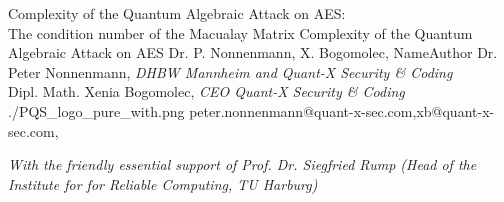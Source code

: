 \documentclass[a4paper,11pt]{article}
\begin{document}
\setcounter{footnote}{0}
\setcounter{figure}{0}



\Aufsatz 
{Complexity of the Quantum Algebraic Attack on AES:\\
The condition number of the Macualay Matrix}
{Complexity of the Quantum Algebraic Attack on AES}
{Dr. P. Nonnenmann, X. Bogomolec,}
{NameAuthor}
{Dr. Peter Nonnenmann,
{\small \textit{DHBW Mannheim and Quant-X Security {\&} Coding}} \\
Dipl. Math. Xenia Bogomolec, 
{\small \textit{CEO Quant-X Security {\&} Coding}} \\}
{./PQS_logo_pure_with.png}
{peter.nonnenmann@quant-x-sec.com,xb@quant-x-sec.com,} 

\noindent
{\small \textit{With the friendly essential support of Prof. Dr. Siegfried Rump (Head of the Institute for for Reliable Computing, TU Harburg) }}
\end{document}
